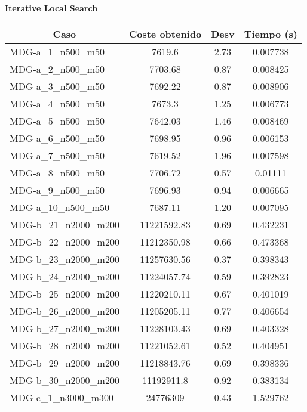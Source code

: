 \documentclass[11pt,a4paper]{article}
\begin{document}
			
			\newpage
\textbf{Iterative Local Search}
\begin{table}[H]
	\begin{center}
		\begin{tabular}{|l|c|c|c|} 
			\hline
			\multicolumn{1}{|c|}{\textbf{Caso}} & \textbf{Coste obtenido} & \textbf{Desv} & \textbf{Tiempo (s)} \\ \hline
					MDG-a\_1\_n500\_m50 & 7619.6 & 2.73 & 0.007738 \\ \hline
					MDG-a\_2\_n500\_m50 & 7703.68 & 0.87 & 0.008425 \\ \hline
					MDG-a\_3\_n500\_m50 & 7692.22 & 0.87 & 0.008906 \\ \hline
					MDG-a\_4\_n500\_m50 & 7673.3 & 1.25 & 0.006773 \\ \hline
					MDG-a\_5\_n500\_m50 & 7642.03 & 1.46 & 0.008469 \\ \hline
					MDG-a\_6\_n500\_m50 & 7698.95 & 0.96 & 0.006153 \\ \hline
					MDG-a\_7\_n500\_m50 & 7619.52 & 1.96 & 0.007598 \\ \hline
					MDG-a\_8\_n500\_m50 & 7706.72 & 0.57 & 0.01111 \\ \hline
					MDG-a\_9\_n500\_m50 & 7696.93 & 0.94 & 0.006665 \\ \hline
					MDG-a\_10\_n500\_m50 & 7687.11 & 1.20 & 0.007095 \\ \hline
					MDG-b\_21\_n2000\_m200 & 11221592.83 & 0.69 & 0.432231 \\ \hline
					MDG-b\_22\_n2000\_m200 & 11212350.98 & 0.66 & 0.473368 \\ \hline
					MDG-b\_23\_n2000\_m200 & 11257630.56 & 0.37 & 0.398343 \\ \hline
					MDG-b\_24\_n2000\_m200 & 11224057.74 & 0.59 & 0.392823 \\ \hline
					MDG-b\_25\_n2000\_m200 & 11220210.11 & 0.67 & 0.401019 \\ \hline
					MDG-b\_26\_n2000\_m200 & 11205205.11 & 0.77 & 0.406654 \\ \hline
					MDG-b\_27\_n2000\_m200 & 11228103.43 & 0.69 & 0.403328 \\ \hline
					MDG-b\_28\_n2000\_m200 & 11221052.61 & 0.52 & 0.404951 \\ \hline
					MDG-b\_29\_n2000\_m200 & 11218843.76 & 0.69 & 0.398336 \\ \hline
					MDG-b\_30\_n2000\_m200 & 11192911.8 & 0.92 & 0.383134 \\ \hline
					MDG-c\_1\_n3000\_m300 & 24776309 & 0.43 & 1.529762 \\ \hline

\end{tabular}
\end{center}
\end{table}
\end{document}
